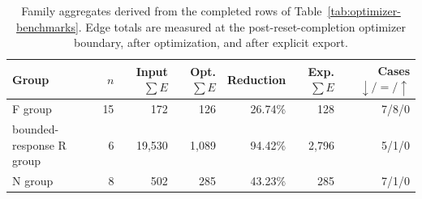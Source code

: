 \begin{table}[t]
\centering
\caption{Family aggregates derived from the completed rows of Table~\ref{tab:optimizer-benchmarks}. Edge totals are measured at the post-reset-completion optimizer boundary, after optimization, and after explicit export.}
\label{tab:optimizer-aggregates}
\scriptsize
\setlength{\tabcolsep}{3pt}
\begin{tabular}{@{}p{}rrrrrr@{}}
\toprule
Group & $n$ & Input $\sum E$ & Opt. $\sum E$ & Reduction & Exp. $\sum E$ & Cases $\downarrow/= /\uparrow$\\
\midrule
F group & 15 & 172 & 126 & 26.74\% & 128 & 7/8/0 \\
bounded-response R group & 6 & 19,530 & 1,089 & 94.42\% & 2,796 & 5/1/0 \\
N group & 8 & 502 & 285 & 43.23\% & 285 & 7/1/0 \\
\bottomrule
\end{tabular}
\end{table}
